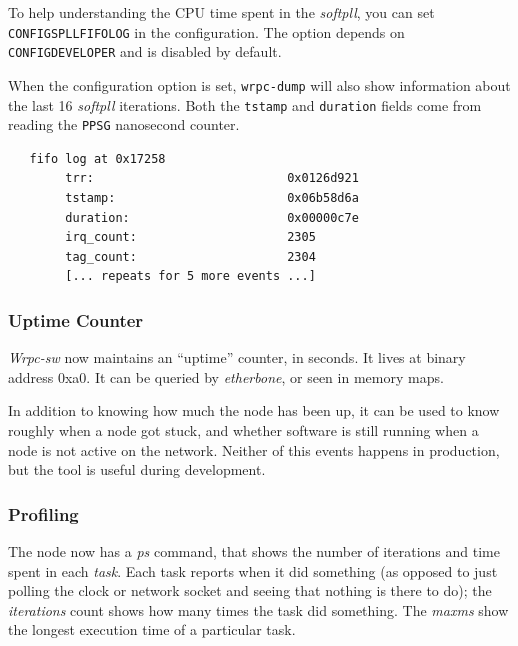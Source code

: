 \documentclass[a4paper, 12pt]{article}
\renewcommand{\_}{\underscore\allowbreak}
\begin{document}
To help understanding the CPU time spent in the \textit{softpll}, you can
set \texttt{CONFIG\_SPLL\_FIFO\_LOG} in the configuration. The option
depends on \texttt{CONFIG\_DEVELOPER} and is disabled by default.

When the configuration option is set, \texttt{wrpc-dump} will also show
information about the last 16 \textit{softpll} iterations. Both the \texttt{tstamp}
and \texttt{duration} fields come from reading the \texttt{PPSG} nanosecond counter.

\begin{lstlisting}
   fifo log at 0x17258
        trr:                           0x0126d921
        tstamp:                        0x06b58d6a
        duration:                      0x00000c7e
        irq_count:                     2305
        tag_count:                     2304
        [... repeats for 5 more events ...]
\end{lstlisting}

\subsubsection{Uptime Counter}
\label{Uptime Counter}

\textit{Wrpc-sw} now maintains an ``uptime'' counter, in seconds. It lives
at binary address 0xa0. It can be queried by \textit{etherbone}, or
seen in memory maps.

In addition to knowing how much the node has been up, it can be used to
know roughly when a node got stuck, and whether software is still
running when a node is not active on the network. Neither of this events
happens in production, but the tool is useful during development.

\subsubsection{Profiling}
\label{Profiling}

The node now has a \textit{ps} command, that shows the number of iterations
and time spent in each \textit{task}. Each task reports when it did
something (as opposed to just polling the clock or network socket and
seeing that nothing is there to do); the \textit{iterations} count shows how many
times the task did something. The \textit{max\_ms} show the longest execution
time of a particular task.
\end{document}

